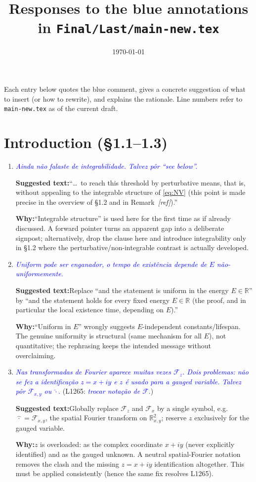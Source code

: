 \documentclass[11pt]{article}
\title{Responses to the blue annotations in \texttt{Final/Last/main-new.tex}}
\author{}
\date{\today}
\newcommand{\R}{\mathbb{R}}
\newcommand{\F}{\mathcal{F}}
\newcommand{\Ft}{\mathcal{F}}
\newcommand{\com}[1]{\textit{\textcolor{blue}{#1}}}
\newcommand{\sugg}[1]{\par\smallskip\textbf{Suggested text:}\quad #1}
\newcommand{\why}[1]{\par\smallskip\textbf{Why:}\quad #1\par\medskip}
\begin{document}
\maketitle

Each entry below quotes the blue comment, gives a concrete suggestion of what
to insert (or how to rewrite), and explains the rationale. Line numbers refer
to \texttt{main-new.tex} as of the current draft.

\section*{Introduction (\S1.1--1.3)}

\begin{enumerate}[leftmargin=*]

\item[\textbf{L790}] \com{Ainda n\~ao falaste de integrabilidade. Talvez p\^or
``see below''.}
\sugg{``\dots\ to reach this threshold by perturbative means, that is, without
appealing to the integrable structure of \eqref{eq:NV} (this point is made
precise in the overview of \S1.2 and in Remark~\textit{[ref]}).''}
\why{``Integrable structure'' is used here for the first time as if already
discussed. A forward pointer turns an apparent gap into a deliberate
signpost; alternatively, drop the clause here and introduce integrability
only in \S1.2 where the perturbative/non-integrable contrast is actually
developed.}

\item[\textbf{L834}] \com{Uniform pode ser enganador, o tempo de exist\^encia
depende de $E$ n\~ao-uniformemente.}
\sugg{Replace ``and the statement is uniform in the energy $E\in\R$'' by
``and the statement holds for every fixed energy $E\in\R$ (the proof, and in
particular the local existence time, depending on $E$).''}
\why{``Uniform in $E$'' wrongly suggests $E$-independent constants/lifespan.
The genuine uniformity is structural (same mechanism for all $E$), not
quantitative; the rephrasing keeps the intended message without overclaiming.}

\item[\textbf{L849 / L1265}] \com{Nas transformadas de Fourier aparece muitas
vezes $\F_z$. Dois problemas: n\~ao se fez a identifica\c c\~ao $z=x+iy$ e $z$
\'e usado para a gauged variable. Talvez p\^or $\F_{x,y}$ ou $\hat{\cdot}$.}
(L1265: \com{trocar nota\c c\~ao de $\F$}.)
\sugg{Globally replace $\F_z$ and $\Ft_x$ by a single symbol, e.g.
$\widehat{\,\cdot\,}=\F_{x,y}$, the spatial Fourier transform on
$\R^2_{x,y}$; reserve $z$ exclusively for the gauged variable.}
\why{$z$ is overloaded: as the complex coordinate $x+iy$ (never explicitly
identified) and as the gauged unknown. A neutral spatial-Fourier notation
removes the clash and the missing $z=x+iy$ identification altogether. This
must be applied consistently (hence the same fix resolves L1265).}


\end{enumerate}
\end{document}
